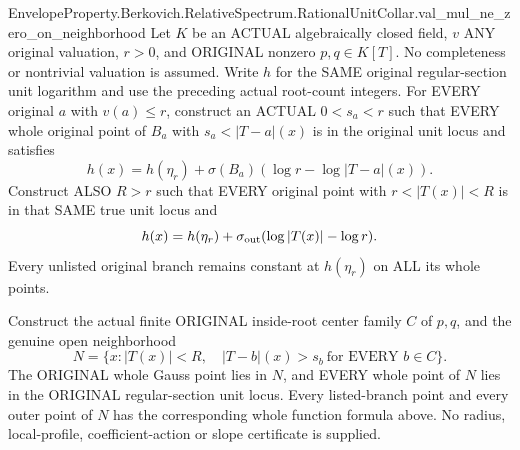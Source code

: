 \begin{theorem}
{EnvelopeProperty.Berkovich.RelativeSpectrum.RationalUnitCollar.val_mul_ne_zero_on_neighborhood}
Let $K$ be an ACTUAL algebraically closed field, $v$ ANY original valuation,
$r>0$, and ORIGINAL nonzero $p,q\in K[T]$. No completeness or nontrivial
valuation is assumed. Write $h$ for the SAME original regular-section unit
logarithm and use the preceding actual root-count integers.
For EVERY original $a$ with $v(a)\le r$, construct an ACTUAL $0<s_a<r$
such that EVERY whole original point of $B_a$ with $s_a<|T-a|(x)$ is in
the original unit locus and satisfies
\[
 h(x)=h(\eta_r)+\sigma(B_a)(\log r-\log|T-a|(x)).
\]
Construct ALSO $R>r$ such that EVERY original point with
$r<|T(x)|<R$ is in that SAME true unit locus and
\[
 h(x)=h(\eta_r)+\sigma_{\rm out}(\log|T(x)|-\log r).
\]
Every unlisted original branch remains constant at $h(\eta_r)$ on ALL
its whole points.

Construct the actual finite ORIGINAL inside-root center family $C$ of
$p,q$, and the genuine open neighborhood
\[
 N=\{x:|T(x)|<R,\quad |T-b|(x)>s_b\ \text{for EVERY }b\in C\}.
\]
The ORIGINAL whole Gauss point lies in $N$, and EVERY whole point of $N$
lies in the ORIGINAL regular-section unit locus. Every listed-branch point
and every outer point of $N$ has the corresponding whole function formula
above. No radius, local-profile, coefficient-action or slope certificate
is supplied.
\end{theorem}
